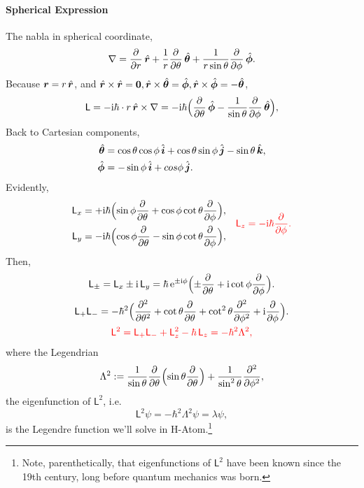 \documentclass{article}
\newcommand*{\op}[1]{\mathsf{#1}}
\newcommand{\spark}[1]{\textcolor{red}{#1}}
\begin{document}
\paragraph{Spherical Expression}The nabla in spherical coordinate,
$$\nabla=\pp r\uvec r+\frac1r\pp \theta\uvec\theta+\frac1{r\sin\theta}\pp \phi\uvec\phi.$$
Because $\bm r=r\uvec r$, and $\uvec{r}\times\uvec{r}=\bm 0,\uvec{r}\times\uvec{\theta}=\uvec{\phi},\uvec{r}\times\uvec{\phi}=-{\uvec{\theta}}$,
$$\op{L}=-\i\hbar\cdot r\uvec r\times\nabla=-\i\hbar\Bigp{\pp \theta\uvec\phi-\frac1{\sin\theta}\pp \phi\uvec\theta},$$
Back to Cartesian components,
\begin{align*}
	\uvec\theta & =\cos\theta\cos\phi\uvec i+\cos\theta\sin\phi\uvec j-\sin\theta\uvec k, \\
	\uvec\phi   & =-\sin\phi\uvec i+cos\phi\uvec j.
\end{align*}
Evidently,
\begin{align*}
	\begin{aligned}
		\op{L}_x & =+\i\hbar\Bigp{\sin\phi\pp \theta+\cos\phi\cot\theta\pp \phi}, \\
		\op{L}_y & =-\i\hbar\Bigp{\cos\phi\pp \theta-\sin\phi\cot\theta\pp \phi},
	\end{aligned}\quad
	\spark{\op{L}_z=-\i\hbar\pp \phi.}
\end{align*}
Then,
\begin{gather*}
	\op{L}_\pm=\op{L}_x\pm \i\,\op{L}_y=\hbar\e^{\pm \i\phi}\Bigp{\pm\pp \theta+\i\cot\phi\pp \phi}.\\
	\op{L}_+\op{L}_-=-\hbar^2\Bigp{\pp[2]\theta+\cot\theta\pp \theta+\cot^2\theta\pp[2]\phi+\i\pp \phi}.\\
	\spark{\op{L}^2=\op{L}_+\op{L}_-+\op{L}_z^2-\hbar\,\op{L}_z=-\hbar^2\Lambda^2,}
\end{gather*}
where the Legendrian
$$\Lambda^2:=\frac1{\sin\theta}\pp \theta\Bigl(\sin\theta\pp \theta\Bigr)+\frac1{\sin^2\theta}\pp[2]\phi,$$
the eigenfunction of $\op{L}^2$, i.e.
$$\op{L}^2\psi=-\hbar^2\Lambda^2\psi=\lambda\psi,$$
\setcounter{footnote}{0}
is the Legendre function we'll solve in H-Atom.\footnote{Note, parenthetically, that eigenfunctions of $\op{L}^2$ have been known since the 19th century, long before quantum mechanics was born.}\clearpage
\end{document}
